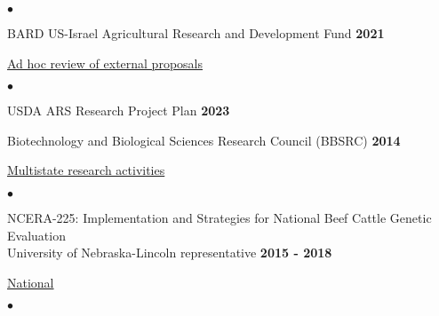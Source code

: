 \documentclass[margin,line,10pt]{res}
\newenvironment{list2}{
  \begin{list}{$\bullet$}{%
      \setlength{\itemsep}{0in}
      \setlength{\parsep}{0in} \setlength{\parskip}{0in}
      \setlength{\topsep}{0in} \setlength{\partopsep}{0in} 
      \setlength{\leftmargin}{0.2in}}}{\end{list}}
\begin{document}
\begin{resume}
\begin{list2}
    \vspace{0.3cm}

    \item BARD US-Israel Agricultural Research and Development Fund \hfill \textbf{2021}  \\
  
    \end{list2}



\begin{flushleft}
\hspace{0.3cm} \underline{Ad hoc review of external proposals}
\end{flushleft}

\begin{list2}

  \item USDA ARS Research Project Plan \hfill \textbf{2023}  \\

  \vspace{0.3cm}

\item  Biotechnology and Biological Sciences Research Council (BBSRC) \hfill \textbf{2014}  \\
\end{list2}




\begin{flushleft}
\hspace{0.3cm} \underline{Multistate research activities}
\end{flushleft}
\begin{list2}


\item NCERA-225: Implementation and Strategies for National Beef Cattle Genetic Evaluation \\ University of Nebraska-Lincoln representative \hfill  \textbf{2015 - 2018}\\
\end{list2}



\begin{flushleft}
  \hspace{0.3cm} \underline{National}
\end{flushleft}
\begin{list2}


\end{list2}
\end{resume}
\end{document}
